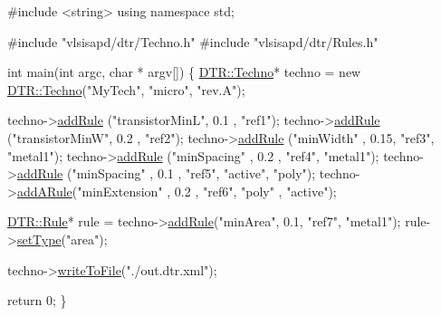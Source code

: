 \begin{DoxyCodeInclude}
\textcolor{preprocessor}{#include <string>}
\textcolor{keyword}{using namespace }std;

\textcolor{preprocessor}{#include "vlsisapd/dtr/Techno.h"}
\textcolor{preprocessor}{#include "vlsisapd/dtr/Rules.h"}

\textcolor{keywordtype}{int} main(\textcolor{keywordtype}{int} argc, \textcolor{keywordtype}{char} * argv[]) \{
    \hyperlink{class_d_t_r_1_1_techno}{DTR::Techno}* techno = \textcolor{keyword}{new} \hyperlink{class_d_t_r_1_1_techno}{DTR::Techno}(\textcolor{stringliteral}{"MyTech"}, \textcolor{stringliteral}{"micro"}, \textcolor{stringliteral}{"rev.A"});

    techno->\hyperlink{class_d_t_r_1_1_techno_afa2c8412c365c950649b9f81661ecafd}{addRule} (\textcolor{stringliteral}{"transistorMinL"}, 0.1 , \textcolor{stringliteral}{"ref1"});
    techno->\hyperlink{class_d_t_r_1_1_techno_afa2c8412c365c950649b9f81661ecafd}{addRule} (\textcolor{stringliteral}{"transistorMinW"}, 0.2 , \textcolor{stringliteral}{"ref2"});
    techno->\hyperlink{class_d_t_r_1_1_techno_afa2c8412c365c950649b9f81661ecafd}{addRule} (\textcolor{stringliteral}{"minWidth"}      , 0.15, \textcolor{stringliteral}{"ref3"}, \textcolor{stringliteral}{"metal1"});
    techno->\hyperlink{class_d_t_r_1_1_techno_afa2c8412c365c950649b9f81661ecafd}{addRule} (\textcolor{stringliteral}{"minSpacing"}    , 0.2 , \textcolor{stringliteral}{"ref4"}, \textcolor{stringliteral}{"metal1"});
    techno->\hyperlink{class_d_t_r_1_1_techno_afa2c8412c365c950649b9f81661ecafd}{addRule} (\textcolor{stringliteral}{"minSpacing"}    , 0.1 , \textcolor{stringliteral}{"ref5"}, \textcolor{stringliteral}{"active"}, \textcolor{stringliteral}{"poly"});
    techno->\hyperlink{class_d_t_r_1_1_techno_a5f5a790974fe7d3b1c6f1b698ef0a818}{addARule}(\textcolor{stringliteral}{"minExtension"}  , 0.2 , \textcolor{stringliteral}{"ref6"}, \textcolor{stringliteral}{"poly"}  , \textcolor{stringliteral}{"active"});
    
    \hyperlink{class_d_t_r_1_1_rule}{DTR::Rule}* rule = techno->\hyperlink{class_d_t_r_1_1_techno_afa2c8412c365c950649b9f81661ecafd}{addRule}(\textcolor{stringliteral}{"minArea"}, 0.1, \textcolor{stringliteral}{"ref7"}, \textcolor{stringliteral}{"metal1"});
    rule->\hyperlink{class_d_t_r_1_1_rule_a3568407d7a7890c39b8c9acc1e608535}{setType}(\textcolor{stringliteral}{"area"});

    techno->\hyperlink{class_d_t_r_1_1_techno_a26b05539dd3345963b8708788b82e2cb}{writeToFile}(\textcolor{stringliteral}{"./out.dtr.xml"});
    
    \textcolor{keywordflow}{return} 0;
\}

\end{DoxyCodeInclude}


